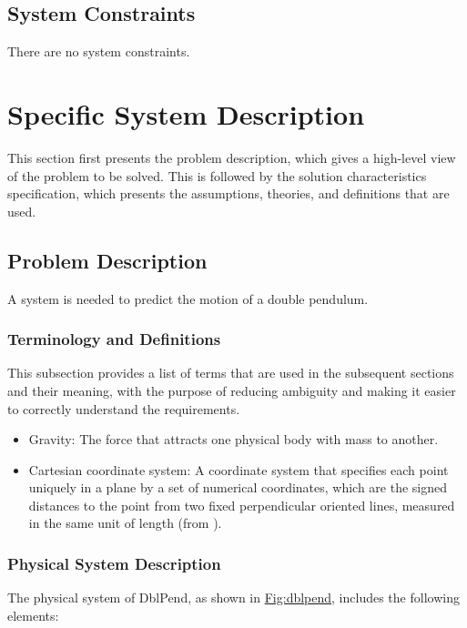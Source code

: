 \documentclass[12pt]{article}
\begin{document}
{\subsection{System Constraints}
\label{Sec:SysConstraints}
There are no system constraints.

\section{Specific System Description}
\label{Sec:SpecSystDesc}
This section first presents the problem description, which gives a high-level view of the problem to be solved. This is followed by the solution characteristics specification, which presents the assumptions, theories, and definitions that are used.

\subsection{Problem Description}
\label{Sec:ProbDesc}
A system is needed to predict the motion of a double pendulum.

\subsubsection{Terminology and Definitions}
\label{Sec:TermDefs}
This subsection provides a list of terms that are used in the subsequent sections and their meaning, with the purpose of reducing ambiguity and making it easier to correctly understand the requirements.

\begin{itemize}
\item{Gravity: The force that attracts one physical body with mass to another.}
\item{Cartesian coordinate system: A coordinate system that specifies each point uniquely in a plane by a set of numerical coordinates, which are the signed distances to the point from two fixed perpendicular oriented lines, measured in the same unit of length (from \cite{cartesianWiki}).}
\end{itemize}
\subsubsection{Physical System Description}
\label{Sec:PhysSyst}
The physical system of DblPend, as shown in \hyperref[Figure:dblpend]{Fig:dblpend}, includes the following elements:

}
\end{document}

